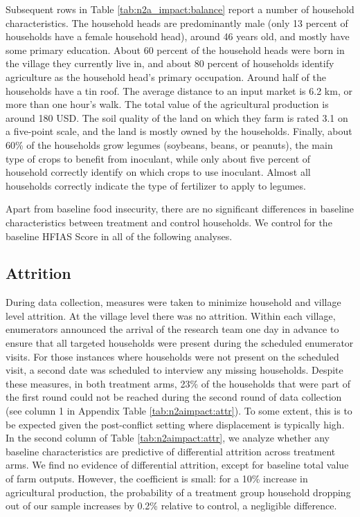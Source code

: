 Subsequent rows in Table \ref{tab:n2a_impact:balance} report a number of household characteristics. The household heads are predominantly male (only 13 percent of households have a female household head), around 46 years old, and mostly have some primary education. About 60 percent of the household heads were born in the village they currently live in, and about 80 percent of households identify agriculture as the household head’s primary occupation. Around half of the households have a tin roof. The average distance to an input market is 6.2 km, or more than one hour’s walk. The total value of the agricultural production is around 180 USD. The soil quality of the land on which they farm is rated 3.1 on a five-point scale, and the land is mostly owned by the households. Finally, about 60\% of the households grow legumes (soybeans, beans, or peanuts), the main type of crops to benefit from inoculant, while only about five percent of household correctly identify on which crops to use inoculant. Almost all households correctly indicate the type of fertilizer to apply to legumes.

Apart from baseline food insecurity, there are no significant differences in baseline characteristics between treatment and control households. We control for the baseline HFIAS Score in all of the following analyses.

\subsection{Attrition}
During data collection, measures were taken to minimize household and village level attrition. At the village level there was no attrition. Within each village, enumerators announced the arrival of the research team one day in advance to ensure that all targeted households were present during the scheduled enumerator visits. For those instances where households were not present on the scheduled visit, a second date was scheduled to interview any missing households. Despite these measures, in both treatment arms, 23\% of the households that were part of the first round could not be reached during the second round of data collection (see column 1 in Appendix Table \ref{tab:n2aimpact:attr}). To some extent, this is to be expected given the post-conflict setting where displacement is typically high. In the second column of Table \ref{tab:n2aimpact:attr}, we analyze whether any baseline characteristics are predictive of differential attrition across treatment arms. We find no evidence of differential attrition, except for baseline total value of farm outputs. However, the coefficient is small: for a 10\% increase in agricultural production, the probability of a treatment group household dropping out of our sample increases by 0.2\% relative to control, a negligible difference. 

